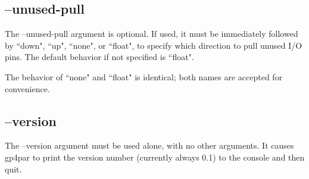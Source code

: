 \documentclass{article}
\begin{document}
\subsection{--unused-pull}

The --unused-pull argument is optional. If used, it must be immediately followed by ``down", ``up", ``none", or 
``float", to specify which direction to pull unused I/O pins. The default behavior if not specified is ``float".

The behavior of ``none" and ``float" is identical; both names are accepted for convenience.

\subsection{--version}

The --version argument must be used alone, with no other arguments. It causes gp4par to print the version number 
(currently always 0.1) to the console and then quit.
\end{document}

